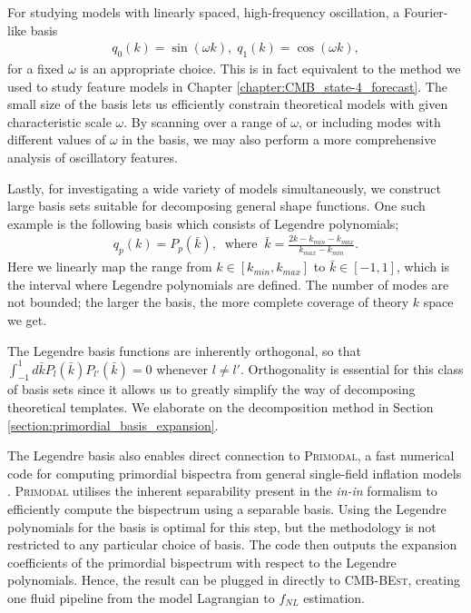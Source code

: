 For studying models with linearly spaced, high-frequency oscillation, a Fourier-like basis
\begin{align}
	q_0(k) = \sin (\omega k), \; q_1(k) = \cos (\omega k), \label{eqn:Fourier_basis}
\end{align}
for a fixed $\omega$ is an appropriate choice. This is in fact equivalent to the method we used to study feature models in Chapter \ref{chapter:CMB_state-4_forecast}. The small size of the basis lets us efficiently constrain theoretical models with given characteristic scale $\omega$. By scanning over a range of $\omega$, or including modes with different values of $\omega$ in the basis, we may also perform a more comprehensive analysis of oscillatory features.

Lastly, for investigating a wide variety of models simultaneously, we construct large basis sets suitable for decomposing general shape functions. One such example is the following basis which consists of Legendre polynomials;
\begin{align}
	q_p(k) = P_p(\bar{k}), \;\;\text{where}\;\; \bar{k} = \frac{2k-k_{min}-k_{max}}{k_{max}-k_{min}}.  \label{eqn:Legendre_basis_no_inv_k}
\end{align}
Here we linearly map the range from $k \in [k_{min},k_{max}]$ to $\bar{k} \in [-1,1]$, which is the interval where Legendre polynomials are defined. The number of modes are not bounded; the larger the basis, the more complete coverage of theory $k$ space we get.

The Legendre basis functions are inherently orthogonal, so that $\int_{-1}^{1} d\bar{k} P_{l}(\bar{k}) P_{l'}(\bar{k}) = 0$ whenever $l \neq l'$. Orthogonality is essential for this class of basis sets since it allows us to greatly simplify the way of decomposing theoretical templates. We elaborate on the decomposition method in Section \ref{section:primordial_basis_expansion}. 

The Legendre basis also enables direct connection to \textsc{Primodal}, a fast numerical code for computing primordial bispectra from general single-field inflation models \cite{Clarke2021}. \textsc{Primodal} utilises the inherent separability present in the \textit{in-in} formalism to efficiently compute the bispectrum using a separable basis. Using the Legendre polynomials for the basis is optimal for this step, but the methodology is not restricted to any particular choice of basis. The code then outputs the expansion coefficients of the primordial bispectrum with respect to the Legendre polynomials. Hence, the result can be plugged in directly to \textsc{CMB-BEst}, creating one fluid pipeline from the model Lagrangian to $f_{NL}$ estimation.

